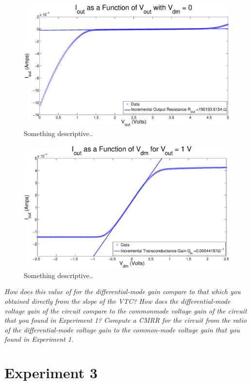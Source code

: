 \documentclass{article}
\begin{document}
\begin{figure}[H]
\centering
\includegraphics[width=\linewidth]{../Figures/Exp2P2.eps}
\caption{Something descriptive..}
\label{fig:exp2p2}
\end{figure}

\begin{figure}[H]
\centering
\includegraphics[width=\linewidth]{../Figures/Exp2P3.eps}
\caption{Something descriptive..}
\label{fig:exp2p3}
\end{figure}

\textit{How does this value of for the differential-mode gain compare to that which you obtained directly from the slope of the
VTC? How does the differential-mode voltage gain of the circuit compare to the commonmode voltage gain of the circuit that you found in Experiment 1? Compute a CMRR for the circuit from the ratio of the differential-mode voltage gain to the common-mode voltage
gain that you found in Experiment 1.}


\section*{Experiment 3} 
\end{document}
